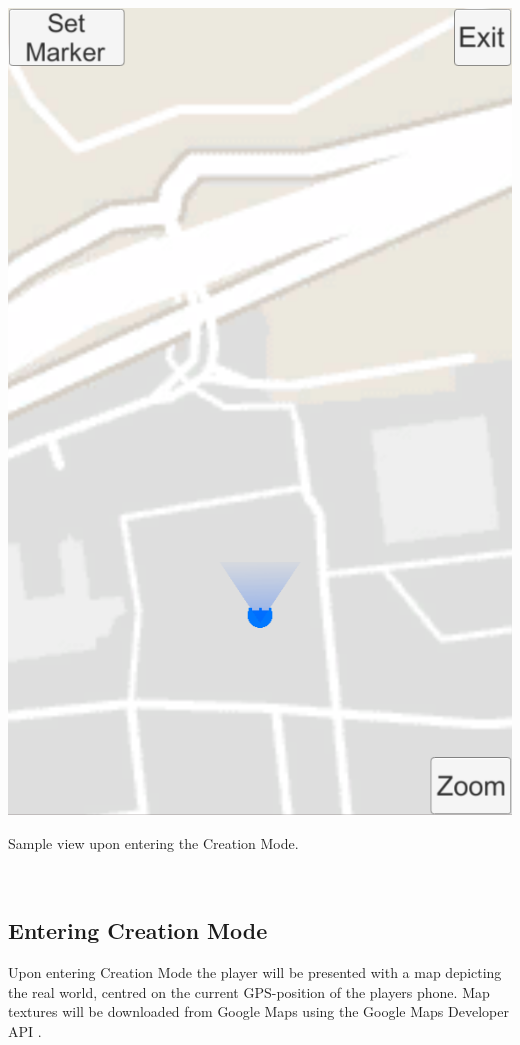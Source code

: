 \documentclass{sigchi-ext}
\begin{document}
\begin{marginfigure}[-20pc]
	\begin{minipage}{\marginparwidth}
		\centering
		\includegraphics[width=0.9\marginparwidth]{figures/CM_Entering}
		\caption{Sample view upon entering the Creation Mode.}~\label{fig:CM_Entering}
	\end{minipage}
\end{marginfigure}


\subsection{Entering Creation Mode}

Upon entering Creation Mode the player will be presented with a map depicting the real world, centred on the current GPS-position of the players phone. Map textures will be downloaded from Google Maps \cite{googlemaps} using the Google Maps Developer API \cite{googlemapsAPI}.
\end{document}
